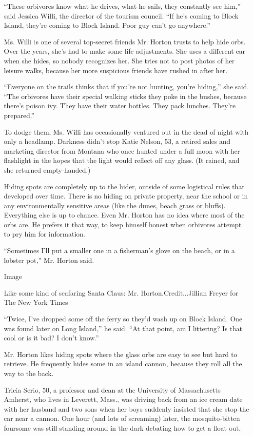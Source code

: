 ``These orbivores know what he drives, what he sails, they constantly
see him,'' said Jessica Willi, the director of the tourism council. ``If
he's coming to Block Island, they're coming to Block Island. Poor guy
can't go anywhere.''

Ms. Willi is one of several top-secret friends Mr. Horton trusts to help
hide orbs. Over the years, she's had to make some life adjustments. She
uses a different car when she hides, so nobody recognizes her. She tries
not to post photos of her leisure walks, because her more suspicious
friends have rushed in after her.

``Everyone on the trails thinks that if you're not hunting, you're
hiding,'' she said. ``The orbivores have their special walking sticks
they poke in the bushes, because there's poison ivy. They have their
water bottles. They pack lunches. They're prepared.''

To dodge them, Ms. Willi has occasionally ventured out in the dead of
night with only a headlamp. Darkness didn't stop Katie Nelson, 53, a
retired sales and marketing director from Montana who once hunted under
a full moon with her flashlight in the hopes that the light would
reflect off any glass. (It rained, and she returned empty-handed.)

Hiding spots are completely up to the hider, outside of some logistical
rules that developed over time. There is no hiding on private property,
near the school or in any environmentally sensitive areas (like the
dunes, beach grass or bluffs). Everything else is up to chance. Even Mr.
Horton has no idea where most of the orbs are. He prefers it that way,
to keep himself honest when orbivores attempt to pry him for
information.

``Sometimes I'll put a smaller one in a fisherman's glove on the beach,
or in a lobster pot,'' Mr. Horton said.

Image

Like some kind of seafaring Santa Claus: Mr. Horton.Credit...Jillian
Freyer for The New York Times

``Twice, I've dropped some off the ferry so they'd wash up on Block
Island. One was found later on Long Island,'' he said. ``At that point,
am I littering? Is that cool or is it bad? I don't know.''

Mr. Horton likes hiding spots where the glass orbs are easy to see but
hard to retrieve. He frequently hides some in an island cannon, because
they roll all the way to the back.

Tricia Serio, 50, a professor and dean at the University of
Massachusetts Amherst, who lives in Leverett, Mass., was driving back
from an ice cream date with her husband and two sons when her boys
suddenly insisted that she stop the car near a cannon. One hour (and
lots of screaming) later, the mosquito-bitten foursome was still
standing around in the dark debating how to get a float out.

